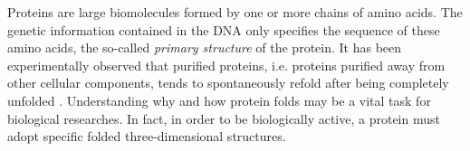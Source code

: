 Proteins are large biomolecules formed by one or more chains of amino acids.
The genetic information contained in the DNA only specifies the sequence of these amino acids, the so-called \emph{primary structure} of the protein.
It has been experimentally observed that purified proteins, i.e. proteins purified away from other cellular components, tends to spontaneously refold after being completely unfolded \cite{ProteinFolding1990}.
Understanding why and how protein folds may be a vital task for biological researches.
In fact, in order to be biologically active, a protein must adopt specific folded three-dimensional structures.